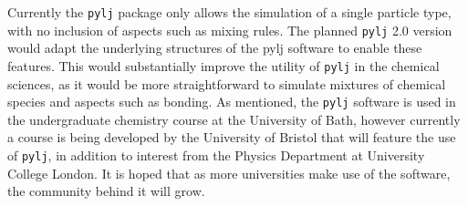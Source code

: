 Currently the \texttt{pylj} package only allows the simulation of a single particle type, with no inclusion of aspects such as mixing rules.
The planned \texttt{pylj} 2.0 version would adapt the underlying structures of the pylj software to enable these features.
This would substantially improve the utility of \texttt{pylj} in the chemical sciences, as it would be more straightforward to simulate mixtures of chemical species and aspects such as bonding.
As mentioned, the \texttt{pylj} software is used in the undergraduate chemistry course at the University of Bath, however currently a course is being developed by the University of Bristol that will feature the use of \texttt{pylj}, in addition to interest from the Physics Department at University College London.
It is hoped that as more universities make use of the software, the community behind it will grow.


\renewcommand\bibsection{\section{\refname}}


